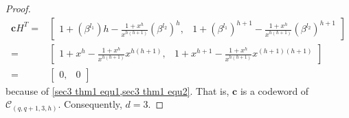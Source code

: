 \documentclass[10pt]{article}%
\begin{document}
\begin{proof}
\begin{equation*}
\begin{aligned}
				\mathbf{c}H^T=&\left[\begin{array}{ll}
					1+(\beta^{l_1})h-\frac{1+x^h}{x^{h(h+1)}}(\beta^{l_2})^{h}, & 1+(\beta^{l_1})^{h+1}-\frac{1+x^h}{x^{h(h+1)}}(\beta^{l_2})^{h+1}
				\end{array}\right]\\
				=&\left[\begin{array}{ll}
					1+x^h-\frac{1+x^h}{x^{h(h+1)}}x^{h(h+1)}, & 1+x^{h+1}-\frac{1+x^h}{x^{h(h+1)}}x^{(h+1)(h+1)}
				\end{array}\right]\\
				=&\left[\begin{array}{ll}
					0, & 0
				\end{array}\right]
			\end{aligned}			
		\end{equation*}
		because of \cref{sec3 thm1 equ1,sec3 thm1 equ2}. That is, $\mathbf{c}$ is a codeword of $\mathcal{C}_{(q,q+1,3,h)}$. Consequently, $d=3$.
		

\end{proof}
\end{document}
